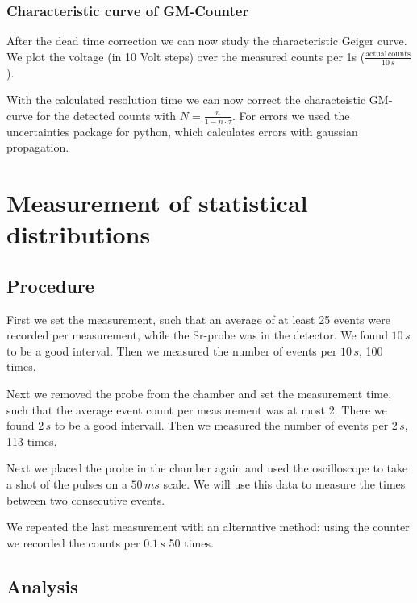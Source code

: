 \subsubsection{Characteristic curve of GM-Counter}
After the dead time correction we can now study the characteristic Geiger curve.
We plot the voltage (in 10 Volt steps) over the measured counts per 1s ($\frac{\mathrm{actual\,counts}}{10\,s}$).

With the calculated resolution time we can now correct the characteistic GM-curve for the detected counts with $N =\frac{n}{1-n\cdot\tau}$. 
For errors we used the uncertainties package for python, which calculates errors with gaussian propagation.


\section{Measurement of statistical distributions}

\subsection{Procedure}

First we set the measurement, such that an average of at least 25 events were recorded per measurement, while the Sr-probe was in the detector. We found $10\,s$ to be a good interval. Then we measured the number of events per $10\,s$, 100 times.

Next we removed the probe from the chamber and set the measurement time, such that the average event count per measurement was at most 2. There we found $2\,s$ to be a good intervall. Then we measured the number of events per $2\,s$, 113 times.

Next we placed the probe in the chamber again and used the oscilloscope to take a shot of the pulses on a $50\,ms$ scale. We will use this data to measure the times between two consecutive events.

We repeated the last measurement with an alternative method: using the counter we recorded the counts per $0.1\,s$ 50 times.

\subsection{Analysis}

